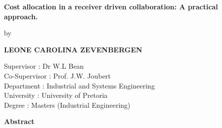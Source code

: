 \thispagestyle{plain}
\begin{center}
        \LARGE
        \textbf{Cost allocation in a receiver driven collaboration: A practical approach.}
        
        \vspace{1.0cm}
        \large
        by
        
        \Large
        \vspace{1.0cm}
        \textbf{LEONE CAROLINA ZEVENBERGEN}\\
        \vspace{1.5cm}
        
        \normalsize
      
            
        Supervisor : Dr W.L Bean\\
        Co-Supervisor : Prof. J.W. Joubert\\
        Department : Industrial and Systems Engineering\\
        University : University of Pretoria\\
        Degree : Masters (Industrial Engineering)\\
       
        
        \vspace{1.5cm}
        
        \LARGE
        \textbf{Abstract}
    
\end{center}